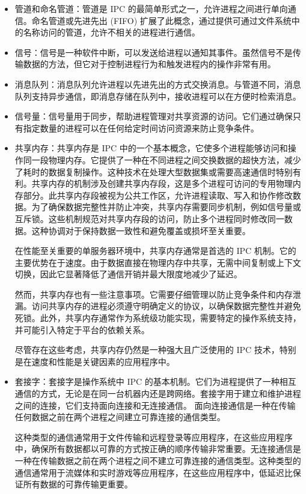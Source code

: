 \begin{itemize}
\item
管道和命名管道：管道是 IPC 的最简单形式之一，允许进程之间进行单向通信。命名管道或先进先出 (FIFO) 扩展了此概念，通过提供可通过文件系统中的名称访问的管道，允许不相关的进程进行通信。

\item
信号：信号是一种软件中断，可以发送给进程以通知其事件。虽然信号不是传输数据的方法，但它对于控制进程行为和触发进程内的操作非常有用。

\item
消息队列：消息队列允许进程以先进先出的方式交换消息。与管道不同，消息队列支持异步通信，即消息存储在队列中，接收进程可以在方便时检索消息。

\item
信号量：信号量用于同步，帮助进程管理对共享资源的访问。它们通过确保只有指定数量的进程可以在任何给定时间访问资源来防止竞争条件。

\item
共享内存：共享内存是 IPC 中的一个基本概念，它使多个进程能够访问和操作同一段物理内存。它提供了一种在不同进程之间交换数据的超快方法，减少了耗时的数据复制操作。这种技术在处理大型数据集或需要高速通信时特别有利。共享内存的机制涉及创建共享内存段，这是多个进程可访问的专用物理内存部分。此共享内存段被视为公共工作区，允许进程读取、写入和协作修改数据。为了确保数据完整性并防止冲突，共享内存需要同步机制，例如信号量或互斥锁。这些机制规范对共享内存段的访问，防止多个进程同时修改同一数据。这种协调对于保持数据一致性和避免覆盖或损坏至关重要。

在性能至关重要的单服务器环境中，共享内存通常是首选的 IPC 机制。它的主要优势在于速度。由于数据直接在物理内存中共享，无需中间复制或上下文切换，因此它显著降低了通信开销并最大限度地减少了延迟。

然而，共享内存也有一些注意事项。它需要仔细管理以防止竞争条件和内存泄漏。访问共享内存的进程必须遵守明确定义的协议，以确保数据完整性并避免死锁。此外，共享内存通常作为系统级功能实现，需要特定的操作系统支持，并可能引入特定于平台的依赖关系。

尽管存在这些考虑，共享内存仍然是一种强大且广泛使用的 IPC 技术，特别是在速度和性能是关键因素的应用程序中。

\item
套接字：套接字是操作系统中 IPC 的基本机制。它们为进程提供了一种相互通信的方式，无论是在同一台机器内还是跨网络。套接字用于建立和维护进程之间的连接，它们支持面向连接和无连接通信。
面向连接通信是一种在传输任何数据之前在两个进程之间建立可靠连接的通信类型。

这种类型的通信通常用于文件传输和远程登录等应用程序，在这些应用程序中，确保所有数据都以可靠的方式按正确的顺序传输非常重要。无连接通信是一种在传输数据之前在两个进程之间不建立可靠连接的通信类型。这种类型的通信通常用于流媒体和实时游戏等应用程序，在这些应用程序中，低延迟比保证所有数据的可靠传输更重要。


\end{itemize}
